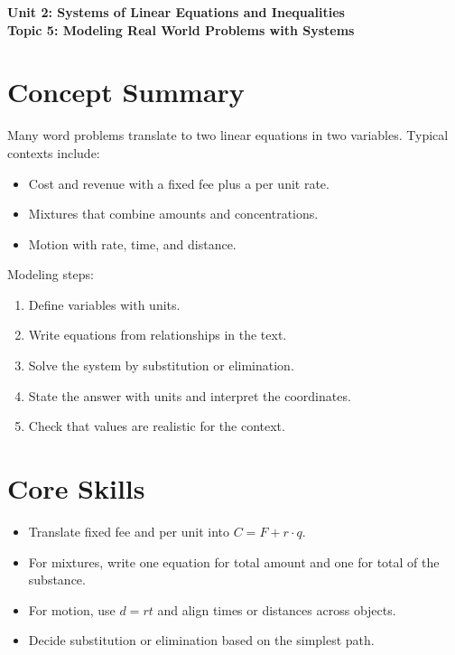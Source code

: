 \documentclass[14pt]{extarticle}
\begin{document}
\raggedright
{}

\begin{center}
    \LARGE \textbf{Unit 2: Systems of Linear Equations and Inequalities} \\[6pt]
    \Large \textbf{Topic 5: Modeling Real World Problems with Systems}
\end{center}

\vspace{1em}

\section*{Concept Summary}

Many word problems translate to two linear equations in two variables. Typical contexts include:
\begin{itemize}
  \item Cost and revenue with a fixed fee plus a per unit rate.
  \item Mixtures that combine amounts and concentrations.
  \item Motion with rate, time, and distance.
\end{itemize}

Modeling steps:
\begin{enumerate}
  \item Define variables with units.
  \item Write equations from relationships in the text.
  \item Solve the system by substitution or elimination.
  \item State the answer with units and interpret the coordinates.
  \item Check that values are realistic for the context.
\end{enumerate}

\section*{Core Skills}
\begin{itemize}
  \item Translate fixed fee and per unit into \(C = F + r\cdot q\).
  \item For mixtures, write one equation for total amount and one for total of the substance.
  \item For motion, use \(d = rt\) and align times or distances across objects.
  \item Decide substitution or elimination based on the simplest path.
\end{itemize}
\end{document}
